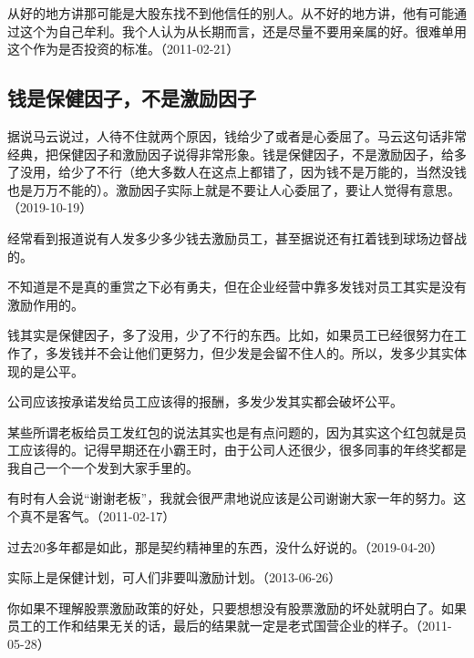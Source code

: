 
从好的地方讲那可能是大股东找不到他信任的别人。从不好的地方讲，他有可能通过这个为自己牟利。我个人认为从长期而言，还是尽量不要用亲属的好。很难单用这个作为是否投资的标准。（2011-02-21）

\subsection{钱是保健因子，不是激励因子}


据说马云说过，人待不住就两个原因，钱给少了或者是心委屈了。马云这句话非常经典，把保健因子和激励因子说得非常形象。钱是保健因子，不是激励因子，给多了没用，给少了不行（绝大多数人在这点上都错了，因为钱不是万能的，当然没钱也是万万不能的）。激励因子实际上就是不要让人心委屈了，要让人觉得有意思。（2019-10-19）

经常看到报道说有人发多少多少钱去激励员工，甚至据说还有扛着钱到球场边督战的。

不知道是不是真的重赏之下必有勇夫，但在企业经营中靠多发钱对员工其实是没有激励作用的。

钱其实是保健因子，多了没用，少了不行的东西。比如，如果员工已经很努力在工作了，多发钱并不会让他们更努力，但少发是会留不住人的。所以，发多少其实体现的是公平。

公司应该按承诺发给员工应该得的报酬，多发少发其实都会破坏公平。

某些所谓老板给员工发红包的说法其实也是有点问题的，因为其实这个红包就是员工应该得的。记得早期还在小霸王时，由于公司人还很少，很多同事的年终奖都是我自己一个一个发到大家手里的。

有时有人会说“谢谢老板”，我就会很严肃地说应该是公司谢谢大家一年的努力。这个真不是客气。（2011-02-17）


过去20多年都是如此，那是契约精神里的东西，没什么好说的。（2019-04-20）


实际上是保健计划，可人们非要叫激励计划。（2013-06-26）

你如果不理解股票激励政策的好处，只要想想没有股票激励的坏处就明白了。如果员工的工作和结果无关的话，最后的结果就一定是老式国营企业的样子。（2011-05-28）


